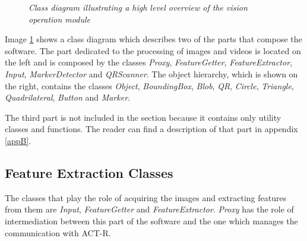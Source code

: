	\begin{figure}[h]
	  \begin{center} 
	  \end{center} 
	  \caption{\textit{Class diagram illustrating a high level overview of the vision operation module}}  
	  \label{fig:classOverview}
 	\end{figure}

	Image \ref{fig:classOverview} shows a class diagram which describes two of the parts that compose the software. 
	The part dedicated to the processing of images and videos is located on the left and is composed by the classes \emph{Proxy}, \emph{FeatureGetter}, \emph{FeatureExtractor}, \emph{Input}, \emph{MarkerDetector} and \emph{QRScanner}.
	The object hierarchy, which is shown on the right, contains the classes \emph{Object}, \emph{BoundingBox}, \emph{Blob}, \emph{QR}, \emph{Circle}, \emph{Triangle}, \emph{Quadrilateral}, \emph{Button} and \emph{Marker}.

	The third part is not included in the section because it contains only utility classes and functions. 
	The reader can find a description of that part in appendix \ref{appB}. 

		\subsection{Feature Extraction Classes}\label{featExtraction}	
		The classes that play the role of acquiring the images and extracting features from them are \emph{Input}, \emph{FeatureGetter} and \emph{FeatureExtractor}. \emph{Proxy} has the role of intermediation between this part of the software and the one which manages the communication with \mbox{ACT-R}.

